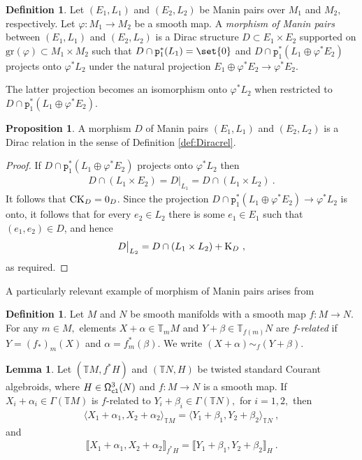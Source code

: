 \documentclass[a4paper, reqno, 11pt]{amsart}
\numberwithin{equation}{section}
\theoremstyle{definition}
\newtheorem{definition}[equation]{Definition}
\newtheorem{proposition}[equation]{Proposition}
\newtheorem{lemma}[equation]{Lemma}
\newcommand{\ip}[1]{\langle #1 \rangle}
\newcommand{\rmp}{\mathtt{p}}
\newcommand{\IT}{\mathbb{T}}
\newcommand{\sfGamma}{{\mathsf{\Gamma}}}
\newcommand{\sfOmega}{{\mathsf{\Omega}}}
\newcommand{\gr}{\text{gr}}
\theoremstyle{remark}
\begin{document}
\begin{definition}
Let $(E_1, L_1)$ and $(E_2, L_2)$ be Manin pairs over $M_1$ and $M_2,$ respectively. Let $\varphi \colon M_1 \to M_2$ be a smooth map.  A \emph{morphism of Manin pairs}    between $(E_1, L_1)$ and $(E_2, L_2)$ is a Dirac structure $D \subset E_1 \times E_2$ supported on $\gr(\varphi) \subset M_1 \times M_2$ such that $D \cap \rmp_1^*(L_1) = \set{0}$ and $D \cap \rmp_1^*(L_1 \oplus \varphi^* E_2)$ projects onto $\varphi^* L_2$ under the natural projection $E_1 \oplus \varphi^* E_2 \to \varphi^* E_2.$
\end{definition}

The latter projection becomes an isomorphism onto $\varphi^*L_2$ when restricted to $D \cap \rmp_1^*(L_1 \oplus \varphi^* E_2).$

\begin{proposition}
 A morphism $D$ of Manin pairs $(E_1, L_1)$ and $(E_2, L_2)$ is a Dirac relation in the sense of Definition \ref{def:Diracrel}.    
\end{proposition}

\begin{proof}
    If $D\cap \rmp_1^*(L_1 \oplus \varphi^* E_2)$ projects onto $\varphi^* L_2$ then
    \begin{align}
        D\cap(L_1 \times E_2) = D\big|_{L_1} = D\cap (L_1 \times L_2) \ .
    \end{align}
    It follows that ${\rm CK}_D = 0_D$. Since the projection $D\cap \rmp_1^*(L_1 \oplus \varphi^* E_2)\to \varphi^*L_2$ is onto, it follows that for every $e_2 \in L_2$ there is some $e_1\in E_1$ such that $(e_1, e_2) \in D$, and hence $$D\big|_{L_2} = D\cap(L_1 \times L_2) + {\rm K}_D \ , $$ as required.
\end{proof}

A particularly relevant example of morphism of Manin pairs arises from 

\begin{definition}
    Let $M$ and $N$ be smooth manifolds with a smooth map $f \colon M \to N$. For any $m \in M,$ elements $X+ \alpha \in \IT_m M$ and $Y+ \beta \in \IT_{f(m)} N$  are $f$-\emph{related} if $Y = (f_*)_m(X)$ and $\alpha = f^*_m(\beta).$ We write $(X+ \alpha) \sim_f (Y+ \beta).$
\end{definition}

\begin{lemma}\label{lemma:stienon}
    Let $(\IT M, f^*H)$ and $(\IT N, H)$ be twisted standard Courant algebroids, where $H\in\sfOmega_{\tt cl}^3(N)$ and $f \colon M \to N$ is a smooth map. If $X_i + \alpha_i \in \sfGamma(\IT M)$ is $f$-related to $Y_i+ \beta_i \in \sfGamma(\IT N),$ for $i=1,2,$ then
    \begin{align}
        \ip{X_1+ \alpha_1, X_2+ \alpha_2}_{\IT M} = \ip{Y_1+ \beta_1, Y_2+ \beta_2}_{\IT N} \ ,
    \end{align}
    and
    \begin{align}
        \llbracket X_1+ \alpha_1, X_2+ \alpha_2\rrbracket_{f^*H} = \llbracket Y_1+ \beta_1, Y_2+ \beta_2\rrbracket_{H} \ .
    \end{align}
\end{lemma}
\end{document}
